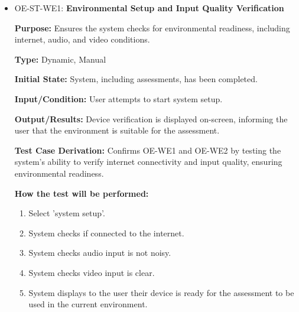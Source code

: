 \documentclass[12pt, titlepage]{article}
\begin{document}
\begin{itemize}
  \item OE-ST-WE1: \textbf{Environmental Setup and Input Quality Verification}
  \begin{mdframed}[linewidth=0.5mm]
      \textbf{Purpose:} Ensures the system checks for environmental readiness, including \\ internet, audio, and video conditions. \par
      \textbf{Type:} Dynamic, Manual \par
      \textbf{Initial State:} System, including assessments, has been completed. \par
      \textbf{Input/Condition:} User attempts to start system setup. \par
      \textbf{Output/Results:} Device verification is displayed on-screen, informing the user that the environment is suitable for the assessment. \par
      \textbf{Test Case Derivation:} Confirms OE-WE1 and OE-WE2 by testing the system’s ability to verify internet connectivity and input quality, ensuring environmental readiness. \par
      \textbf{How the test will be performed:}
      \begin{enumerate}[noitemsep]
        \item Select 'system setup'.
        \item System checks if connected to the internet.
        \item System checks audio input is not noisy.
        \item System checks video input is clear.
        \item System displays to the user their device is ready for the assessment to be used in the current environment.
      \end{enumerate}
  \end{mdframed}


\end{itemize}
\end{document}
